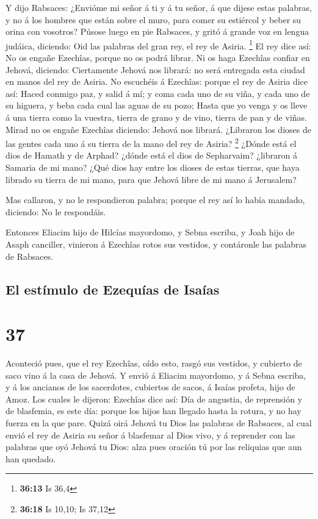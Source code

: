  Y dijo Rabsaces: ¿Envióme mi señor á ti y á tu señor, á
que dijese estas palabras, y no á los hombres que están sobre el muro,
para comer su estiércol y beber su orina con vosotros? 
Púsose luego en pie Rabsaces, y gritó á grande voz en lengua judáica,
diciendo: Oid las palabras del gran rey, el rey de Asiria. \footnote{\textbf{36:13}
  Is 36,4}  El rey dice así: No os engañe Ezechîas, porque
no os podrá librar.  Ni os haga Ezechîas confiar en Jehová,
diciendo: Ciertamente Jehová nos librará: no será entregada esta ciudad
en manos del rey de Asiria.  No escuchéis á Ezechîas:
porque el rey de Asiria dice así: Haced conmigo paz, y salid á mí; y
coma cada uno de su viña, y cada uno de su higuera, y beba cada cual las
aguas de su pozo;  Hasta que yo venga y os lleve á una
tierra como la vuestra, tierra de grano y de vino, tierra de pan y de
viñas.  Mirad no os engañe Ezechîas diciendo: Jehová nos
librará. ¿Libraron los dioses de las gentes cada uno á su tierra de la
mano del rey de Asiria? \footnote{\textbf{36:18} Is 10,10; Is 37,12}
 ¿Dónde está el dios de Hamath y de Arphad? ¿dónde está el
dios de Sepharvaim? ¿libraron á Samaria de mi mano?  ¿Qué
dios hay entre los dioses de estas tierras, que haya librado su tierra
de mi mano, para que Jehová libre de mi mano á Jerusalem?

 Mas callaron, y no le respondieron palabra; porque el rey
así lo había mandado, diciendo: No le respondáis.

 Entonces Eliacim hijo de Hilcías mayordomo, y Sebna
escriba, y Joah hijo de Asaph canciller, vinieron á Ezechîas rotos sus
vestidos, y contáronle las palabras de Rabsaces.

\hypertarget{el-estuxedmulo-de-ezequuxedas-de-isauxedas}{%
\subsection{El estímulo de Ezequías de
Isaías}\label{el-estuxedmulo-de-ezequuxedas-de-isauxedas}}

\hypertarget{section-36}{%
\section{37}\label{section-36}}

 Aconteció pues, que el rey Ezechîas, oído esto, rasgó sus
vestidos, y cubierto de saco vino á la casa de Jehová.  Y
envió á Eliacim mayordomo, y á Sebna escriba, y á los ancianos de los
sacerdotes, cubiertos de sacos, á Isaías profeta, hijo de Amoz.
 Los cuales le dijeron: Ezechîas dice así: Día de angustia,
de reprensión y de blasfemia, es este día: porque los hijos han llegado
hasta la rotura, y no hay fuerza en la que pare.  Quizá oirá
Jehová tu Dios las palabras de Rabsaces, al cual envió el rey de Asiria
su señor á blasfemar al Dios vivo, y á reprender con las palabras que
oyó Jehová tu Dios: alza pues oración tú por las reliquias que aun han
quedado.


